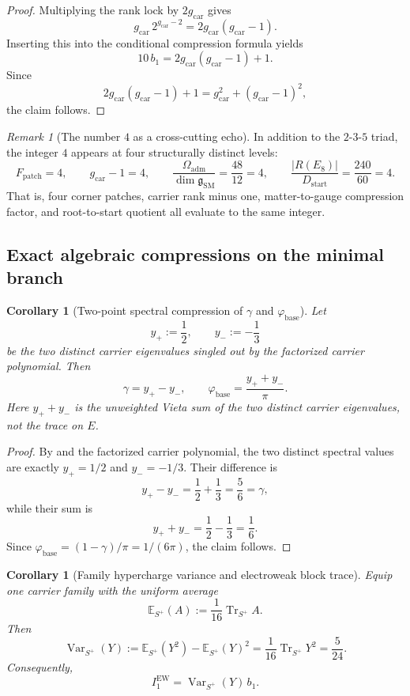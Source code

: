 \documentclass[11pt,a4paper]{article}
\newtheorem{corollary}[theorem]{Corollary}
\theoremstyle{definition}
\theoremstyle{remark}
\newtheorem*{remark}{Remark}
\DeclareMathOperator{\tr}{Tr}
\newcommand{\phibase}{\varphi_{\mathrm{base}}}
\newcommand{\bone}{b_1}
\newcommand{\SM}{\mathrm{SM}}
\newcommand{\Oadm}{\Omega_{\mathrm{adm}}}
\newcommand{\gcar}{g_{\mathrm{car}}}
\newcommand{\Dstart}{D_{\mathrm{start}}}
\begin{document}
\begin{proof}
Multiplying the rank lock by $2\gcar$ gives
\[
\gcar\,2^{\gcar-2}=2\gcar(\gcar-1).
\]
Inserting this into the conditional compression formula yields
\[
10\,\bone=2\gcar(\gcar-1)+1.
\]
Since
\[
2\gcar(\gcar-1)+1=\gcar^2+(\gcar-1)^2,
\]
the claim follows.
\end{proof}

\begin{remark}[The number $4$ as a cross-cutting echo]
In addition to the $2$-$3$-$5$ triad, the integer $4$ appears at four structurally distinct levels:
\[
F_{\mathrm{patch}}=4,
\qquad
\gcar-1=4,
\qquad
\frac{\Oadm}{\dim\mathfrak g_{\SM}}=\frac{48}{12}=4,
\qquad
\frac{|R(E_8)|}{\Dstart}=\frac{240}{60}=4.
\]
That is, four corner patches, carrier rank minus one, matter-to-gauge compression factor, and root-to-start quotient all evaluate to the same integer.
\end{remark}

\subsection{Exact algebraic compressions on the minimal branch}

\begin{corollary}[Two-point spectral compression of $\gamma$ and $\phibase$]
Let
\[
y_+:=\frac12,
\qquad
y_-:=-\frac13
\]
be the two distinct carrier eigenvalues singled out by the factorized carrier polynomial. Then
\[
\gamma=y_+-y_-,
\qquad
\phibase=\frac{y_++y_-}{\pi}.
\]
Here $y_++y_-$ is the unweighted Vieta sum of the two distinct carrier eigenvalues, not the trace on $E$.
\end{corollary}

\begin{proof}
By  and the factorized carrier polynomial, the two distinct spectral values are exactly $y_+=1/2$ and $y_-=-1/3$. Their difference is
\[
y_+-y_-=\frac12+\frac13=\frac56=\gamma,
\]
while their sum is
\[
y_++y_-=\frac12-\frac13=\frac16.
\]
Since $\phibase=(1-\gamma)/\pi=1/(6\pi)$, the claim follows.
\end{proof}

\begin{corollary}[Family hypercharge variance and electroweak block trace]
Equip one carrier family with the uniform average
\[
\mathbb E_{S^+}(A):=\frac{1}{16}\tr_{S^+}A.
\]
Then
\[
\operatorname{Var}_{S^+}(Y)
:=
\mathbb E_{S^+}(Y^2)-\mathbb E_{S^+}(Y)^2
=
\frac{1}{16}\tr_{S^+}Y^2
=
\frac{5}{24}.
\]
Consequently,
\[
I_1^{\mathrm{EW}}=\operatorname{Var}_{S^+}(Y)\,\bone.
\]
\end{corollary}
\end{document}
